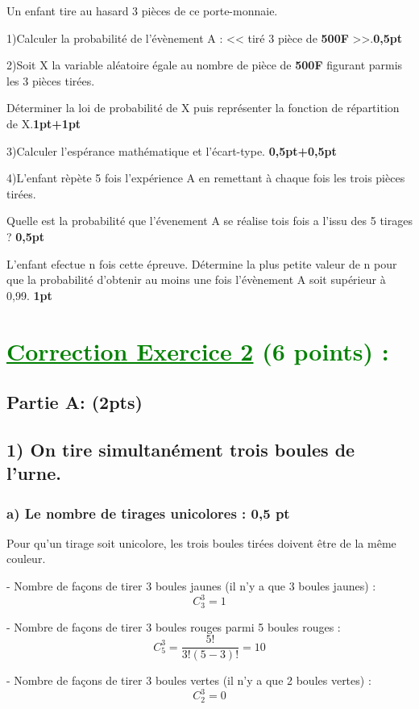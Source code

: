 \documentclass[12pt]{article}
\begin{document}
Un enfant tire au hasard 3 pièces de ce porte-monnaie.

1)Calculer la probabilité de l'évènement A : << tiré 3 pièce de \textbf{500F} >>.\textbf{0,5pt}

2)Soit X la variable aléatoire égale au nombre de pièce de \textbf{500F} figurant parmis les 3 pièces tirées.

Déterminer la loi de probabilité de X puis représenter la fonction de répartition de X.\textbf{1pt+1pt}

3)Calculer l'espérance mathématique et l'écart-type. \textbf{0,5pt+0,5pt}

4)L'enfant rèpète 5 fois l'expérience A en remettant à chaque fois les trois pièces tirées.

Quelle est la probabilité que l'évenement A se réalise tois fois a l'issu des 5 tirages ? \textbf{0,5pt}

L'enfant efectue n fois cette épreuve. Détermine la plus petite valeur de n pour que la probabilité d'obtenir au moins une fois l'évènement A soit supérieur à 0,99. \textbf{1pt}
\section*{\textcolor{green}{\underline{Correction Exercice 2} (6 points) :}}
\subsection*{Partie A: (2pts)}

\subsection*{1) On tire simultanément trois boules de l'urne.}

\subsubsection*{a) Le nombre de tirages unicolores : \textbf{0,5 pt}}

Pour qu'un tirage soit unicolore, les trois boules tirées doivent être de la même couleur.

- Nombre de façons de tirer 3 boules jaunes (il n'y a que 3 boules jaunes) :
  \[
  C_{3}^{3} = 1
  \]

- Nombre de façons de tirer 3 boules rouges parmi 5 boules rouges :
  \[
  C_{5}^{3} = \frac{5!}{3!(5-3)!} = 10
  \]

- Nombre de façons de tirer 3 boules vertes (il n'y a que 2 boules vertes) :
  \[
  C_{2}^{3} = 0
  \]
\end{document}
